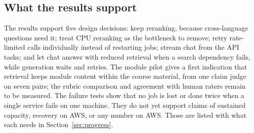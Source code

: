 \subsection{What the results support}
The results support five design decisions: keep reranking, because cross-language questions need it; treat CPU reranking as the bottleneck to remove; retry rate-limited calls individually instead of restarting jobs; stream chat from the API tasks; and let chat answer with reduced retrieval when a search dependency fails, while generation waits and retries. The module pilot gives a first indication that retrieval keeps module content within the course material, from one claim judge on seven pairs; the rubric comparison and agreement with human raters remain to be measured. The failure tests show that no job is lost or done twice when a single service fails on one machine. They do not yet support claims of sustained capacity, recovery on AWS, or any number on AWS. Those are listed with what each needs in Section~\ref{sec:progress}.
